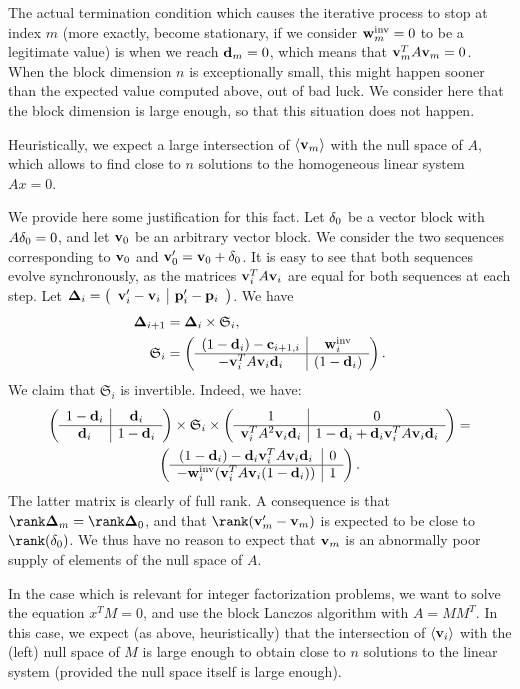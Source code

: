The actual termination condition which causes the iterative process to stop at index
$m$ (more
exactly, become stationary, if we consider $\mathbf{w}_{m}^{\text{inv}}=0$ to
be a legitimate value) is when we reach $\mathbf{d}_m=0$, which means that
$\mathbf{v}_m^TA\mathbf{v}_m=0$. When the block dimension $n$ is exceptionally small,
this might happen sooner than the expected value computed above, out of bad luck. We consider here that the block
dimension is large enough, so that this situation does not happen.

Heuristically, we expect a large intersection of
$\langle\mathbf{v}_m\rangle$ with the null space of $A$, which allows to find
close to $n$ solutions to the homogeneous linear system $Ax=0$.

We provide here some justification for this fact. Let $\mathbf{\delta}_0$ be a
vector block with $A\mathbf{\delta}_0=0$, and let $\mathbf{v}_0$ be an arbitrary
vector block.  We consider the two sequences corresponding to $\mathbf{v}_0$
and $\mathbf{v}'_0=\mathbf{v}_0+\mathbf{\delta}_0$.  It is easy to see that both sequences
evolve synchronously, as the matrices $\mathbf{v}_i^TA\mathbf{v}_i$ are equal for
both sequences at each step.  Let
$\mathbf{\Delta}_i=\left(\begin{array}{c|c}\mathbf{v}'_i-\mathbf{v}_i&\mathbf{p}'_i-\mathbf{p}_i\end{array}\right)$.
We have
\begin{align*}
\mathbf{\Delta}_{i+1}&=
\mathbf{\Delta}_{i}
\times\mathfrak{S}_i,\\
\mathfrak{S}_i &=
\left(\begin{array}{c|c}(1-\mathbf{d}_i)-\mathbf{c}_{i+1,i}&\mathbf{w}_{i}^{\text{inv}}\\\hline-\mathbf{v}_i^TA\mathbf{v}_i\mathbf{d}_i&(1-\mathbf{d}_{i})\end{array}\right).
\end{align*}
We claim that $\mathfrak{S}_i$ is invertible. Indeed, we have:
\begin{gather*}
    \left(\begin{array}{c|c}1-\mathbf{d}_i&\mathbf{d}_i\\\hline\mathbf{d}_i&1-\mathbf{d}_i\end{array}\right)\times
\mathfrak{S}_i \times
\left(\begin{array}{c|c}1&0\\\hline\mathbf{v}_i^TA^2\mathbf{v}_i\mathbf{d}_i&1-\mathbf{d}_i+\mathbf{d}_i\mathbf{v}_i^TA\mathbf{v}_i\mathbf{d}_i\end{array}\right)
=\\
\left(\begin{array}{c|c}(1-\mathbf{d}_i)-
\mathbf{d}_i\mathbf{v}_i^TA\mathbf{v}_i\mathbf{d}_i&0\\\hline-\mathbf{w}_i^{\text{inv}} (\mathbf{v}_i^TA\mathbf{v}_i(1-\mathbf{d}_i))&1\end{array}\right).
\end{gather*}
The latter matrix is clearly of full rank. A consequence is that
$\rank\bfDelta_m=\rank\bfDelta_0$, and that $\rank(\bfv'_m-\bfv_m)$ is
expected to be close to $\rank(\delta_0)$. We thus have no reason to expect
that $\mathbf{v}_m$ is an abnormally poor supply of elements of the null space
of $A$.


In the case which is relevant for integer factorization problems, we want
to solve the equation $x^TM=0$, and use the block Lanczos algorithm with
$A=MM^T$. In this case, we expect (as above, heuristically) that the intersection of
$\langle\mathbf{v}_i\rangle$ with the (left) null space of $M$ is large enough
to obtain close to  $n$ solutions to the linear system (provided the null
space itself is large enough).
\medskip

